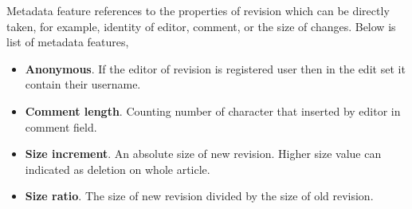 Metadata feature references to the properties of revision which can be directly
taken, for example, identity of editor, comment, or the size of changes.
Below is list of metadata features,
\begin{itemize}
\item \textbf{Anonymous}. If the editor of revision is registered user then in
the edit set it contain their username.
\item \textbf{Comment length}. Counting number of character that inserted by
editor in comment field.
\item \textbf{Size increment}. An absolute size of new revision. Higher size
value can indicated as deletion on whole article.
\item \textbf{Size ratio}. The size of new revision divided by the size of old
revision.
\end{itemize}
